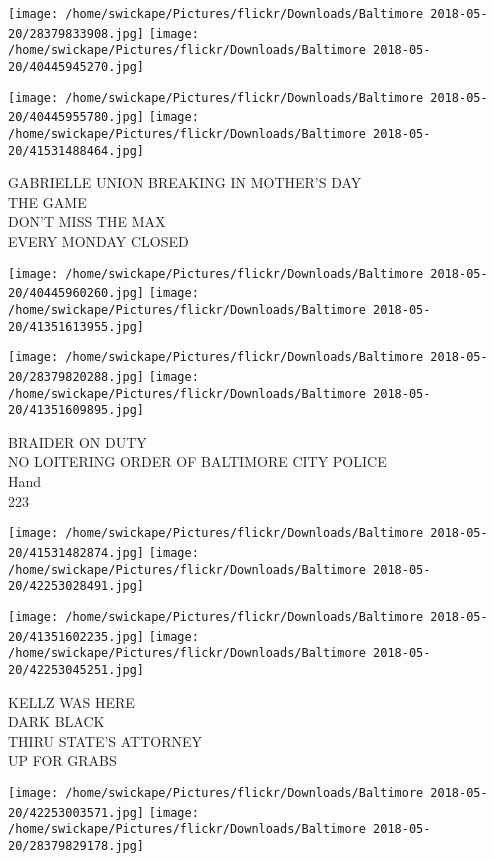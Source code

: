 \documentclass[10pt,letterpaper]{article}
\begin{document}
\texttt{[image: /home/swickape/Pictures/flickr/Downloads/Baltimore 2018-05-20/28379833908.jpg]}
\texttt{[image: /home/swickape/Pictures/flickr/Downloads/Baltimore 2018-05-20/40445945270.jpg]}

\texttt{[image: /home/swickape/Pictures/flickr/Downloads/Baltimore 2018-05-20/40445955780.jpg]}
\texttt{[image: /home/swickape/Pictures/flickr/Downloads/Baltimore 2018-05-20/41531488464.jpg]}

GABRIELLE UNION BREAKING IN MOTHER'S DAY\\
THE GAME\\
DON'T MISS THE MAX\\
EVERY MONDAY CLOSED\\
\pagebreak

\texttt{[image: /home/swickape/Pictures/flickr/Downloads/Baltimore 2018-05-20/40445960260.jpg]}
\texttt{[image: /home/swickape/Pictures/flickr/Downloads/Baltimore 2018-05-20/41351613955.jpg]}

\texttt{[image: /home/swickape/Pictures/flickr/Downloads/Baltimore 2018-05-20/28379820288.jpg]}
\texttt{[image: /home/swickape/Pictures/flickr/Downloads/Baltimore 2018-05-20/41351609895.jpg]}

BRAIDER ON DUTY\\
NO LOITERING ORDER OF BALTIMORE CITY POLICE\\
Hand\\
223\\
\pagebreak

\texttt{[image: /home/swickape/Pictures/flickr/Downloads/Baltimore 2018-05-20/41531482874.jpg]}
\texttt{[image: /home/swickape/Pictures/flickr/Downloads/Baltimore 2018-05-20/42253028491.jpg]}

\texttt{[image: /home/swickape/Pictures/flickr/Downloads/Baltimore 2018-05-20/41351602235.jpg]}
\texttt{[image: /home/swickape/Pictures/flickr/Downloads/Baltimore 2018-05-20/42253045251.jpg]}

KELLZ WAS HERE\\
DARK BLACK\\
THIRU STATE'S ATTORNEY\\
UP FOR GRABS\\
\pagebreak

\texttt{[image: /home/swickape/Pictures/flickr/Downloads/Baltimore 2018-05-20/42253003571.jpg]}
\texttt{[image: /home/swickape/Pictures/flickr/Downloads/Baltimore 2018-05-20/28379829178.jpg]}
\end{document}

